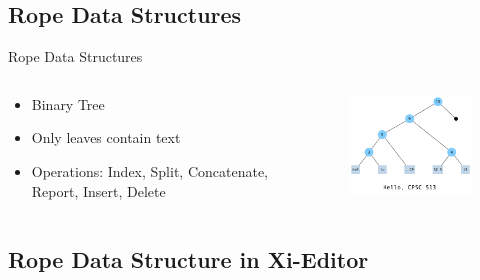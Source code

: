 \documentclass{beamer}
\begin{document}
\subsection{Rope Data Structures}

\begin{frame}{Rope Data Structures}
  \begin{columns}
    \begin{column}{0.5\textwidth}
        \begin{itemize}
            \item Binary Tree
            \item Only leaves contain text
            \item Operations: Index, Split, Concatenate, Report, Insert, Delete
        \end{itemize}
    \end{column}
    \begin{column}{0.5\textwidth}
      \begin{figure}
          \centering
          \includegraphics[width=5.5cm]{images/rope.png}
      \end{figure}
    \end{column}
  \end{columns}
\end{frame}





\subsection{Rope Data Structure in Xi-Editor}
\end{document}
